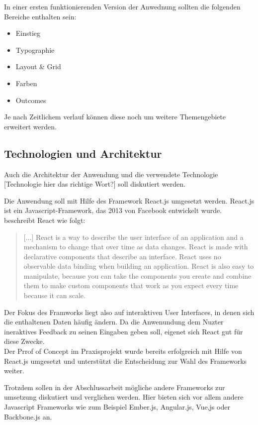 In einer ersten funktionierenden Version der Anwednung sollten die folgenden Bereiche enthalten sein:

\begin{itemize}
  \item Einstieg
  \item Typographie
  \item Layout \& Grid
  \item Farben
  \item Outcomes
\end{itemize}

Je nach Zeitlichem verlauf können diese noch um weitere Themengebiete erweitert werden.

\subsection{Technologien und Architektur}
Auch die Architektur der Anwendung und die verwendete Technologie [Technologie hier das richtige Wort?] soll diskutiert werden.

Die Anwendung soll mit Hilfe des Framework React.js umgesetzt werden. React.js ist ein Javascript-Framework, das 2013 von Facebook entwickelt wurde. \cite{gackenheimer2015react} beschreibt React wie folgt:

\begin{quote}
[...] React is a way to describe the user interface of an application and a mechanism to change that over time as data changes. React is made with declarative components that describe an interface. React uses no observable data binding when building an application. React is also easy to manipulate, because you can take the components you create and combine them to make custom components that work as you expect every time because it can scale.
\end{quote}

Der Fokus des Framworks liegt also auf interaktiven User Interfaces, in denen sich die enthaltenen Daten häufig ändern. Da die Anwenundung dem Nuzter ineraktives Feedback zu seinen Eingaben geben soll, eigenet sich React gut für diese Zwecke. \\
Der Prrof of Concept im Praxisprojekt wurde bereits erfolgreich mit Hilfe von React.js umgesetzt und unterstützt die Entscheidung zur Wahl des Frameworks weiter.

Trotzdem sollen in der Abschlussarbeit mögliche andere Frameworks zur umsetzung diskutiert und verglichen werden. Hier bieten sich vor allem andere Javascript Frameworks wie zum Beispiel Ember.js, Angular.js, Vue,js oder Backbone.js an.

